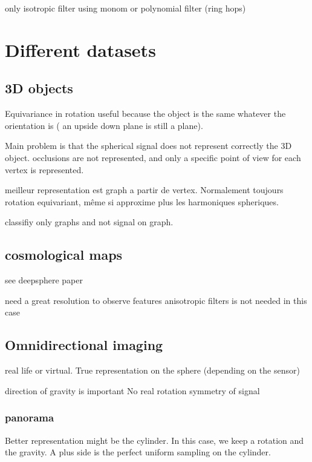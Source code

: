 \documentclass[11pt]{report}
\begin{document}
only isotropic filter using monom or polynomial filter (ring hops)


\chapter{Different datasets}\label{chap:Datasets}
\section{3D objects}
Equivariance in rotation useful because the object is the same whatever the orientation is ( an upside down plane is still a plane).

Main problem is that the spherical signal does not represent correctly the 3D object. occlusions are not represented, and only a specific point of view for each vertex is represented.

meilleur representation est graph a partir de vertex. Normalement toujours rotation equivariant, même si approxime plus les harmoniques spheriques.

classifiy only graphs and not signal on graph.

\section{cosmological maps}
see deepsphere paper

need a great resolution to observe features
anisotropic filters is not needed in this case

\section{Omnidirectional imaging}
real life or virtual.
True representation on the sphere (depending on the sensor)

direction of gravity is important
No real rotation symmetry of signal
\subsection{panorama}
Better representation might be the cylinder. In this case, we keep a rotation and the gravity. A plus side is the perfect uniform sampling on the cylinder.
\end{document}
